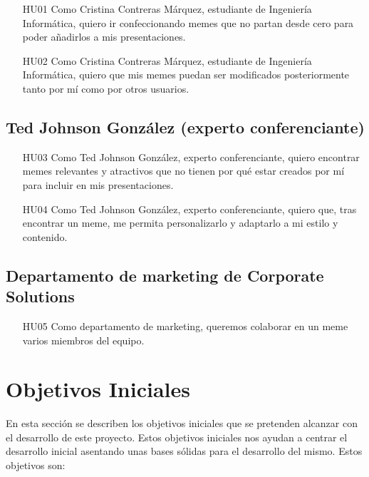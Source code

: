         \begin{enumerate}
            \item [HU01] Como Cristina Contreras Márquez, estudiante de Ingeniería Informática, quiero ir confeccionando memes que no partan desde cero para poder añadirlos a mis presentaciones.
            \item [HU02] Como Cristina Contreras Márquez, estudiante de Ingeniería Informática, quiero que mis memes puedan ser modificados posteriormente tanto por mí como por otros usuarios.
        \end{enumerate}

    \subsection{Ted Johnson González (experto conferenciante)}

        \begin{enumerate}
            \item [HU03] Como Ted Johnson González, experto conferenciante, quiero encontrar memes relevantes y atractivos que no tienen por qué estar creados por mí para incluir en mis presentaciones.
            \item [HU04] Como Ted Johnson González, experto conferenciante, quiero que, tras encontrar un meme, me permita personalizarlo y adaptarlo a mi estilo y contenido.
        \end{enumerate}

    \subsection{Departamento de marketing de Corporate Solutions}

        \begin{enumerate}
            \item [HU05] Como departamento de marketing, queremos colaborar en un meme varios miembros del equipo.
        \end{enumerate}

\section{Objetivos Iniciales}

En esta sección se describen los objetivos iniciales que se pretenden alcanzar con el desarrollo de este proyecto. Estos objetivos iniciales nos ayudan a centrar el desarrollo inicial asentando unas bases sólidas para el desarrollo del mismo. Estos objetivos son:

